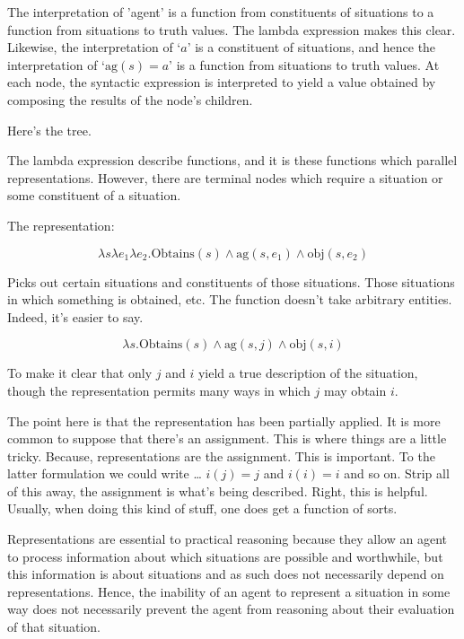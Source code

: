 \documentclass[10pt]{article}
\begin{document}
The interpretation of 'agent' is a function from constituents of situations to a function from situations to truth values.
The lambda expression makes this clear.
Likewise, the interpretation of `\(a\)' is a constituent of situations, and hence the interpretation of `\(\text{ag}(s) = a\)' is a function from situations to truth values.
At each node, the syntactic expression is interpreted to yield a value obtained by composing the results of the node's children.


Here's the tree.








The lambda expression describe functions, and it is these functions which parallel representations.
However, there are terminal nodes which require a situation or some constituent of a situation.




The representation:

\[
\lambda s \lambda e_{1} \lambda e_{2}. \text{Obtains}(s) \land \text{ag}(s,e_{1}) \land \text{obj}(s,e_{2})
\]


Picks out certain situations and constituents of those situations.
Those situations in which something is obtained, etc.
The function doesn't take arbitrary entities.
Indeed, it's easier to say.

\[
\lambda s. \text{Obtains}(s) \land \text{ag}(s,j) \land \text{obj}(s,i)
\]

To make it clear that only \(j\) and \(i\) yield a true description of the situation, though the representation permits many ways in which \(j\) may obtain \(i\).

The point here is that the representation has been partially applied.
It is more common to suppose that there's an assignment.
This is where things are a little tricky.
Because, representations are the assignment.
This is important.
To the latter formulation we could write \dots
\(i(j) = j\)
and
\(i(i) = i\)
and so on.
Strip all of this away, the assignment is what's being described.
Right, this is helpful.
Usually, when doing this kind of stuff, one does get a function of sorts.










Representations are essential to practical reasoning because they allow an agent to process information about which situations are possible and worthwhile, but this information is about situations and as such does not necessarily depend on representations.
Hence, the inability of an agent to represent a situation in some way does not necessarily prevent the agent from reasoning about their evaluation of that situation.
\end{document}
